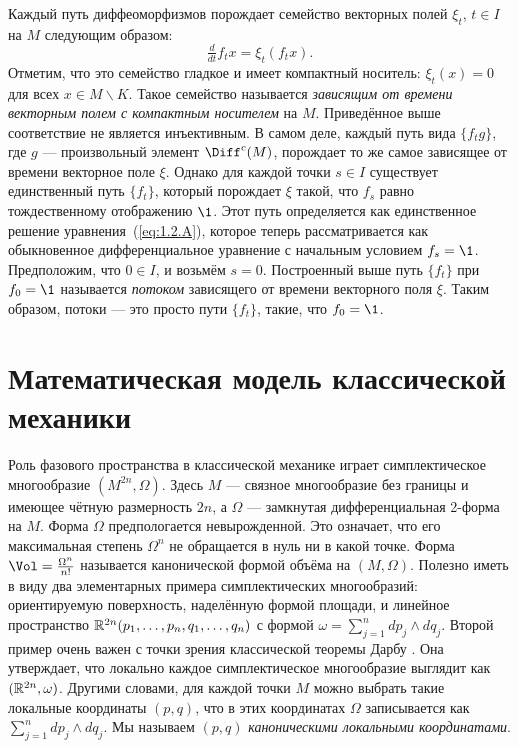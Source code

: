 Каждый путь диффеоморфизмов порождает семейство векторных полей $\xi_t$, $t \in I$ на $M$ следующим образом: 
\begin{equation}\tfrac{d}{dt} f_t x = \xi_t (f_t x).
\label{eq:1.2.A}
\end{equation}
Отметим, что это семейство гладкое и имеет компактный носитель: $\xi_t (x) = 0$ для всех $x \in M \backslash K$.
Такое семейство называется \emph{зависящим от времени векторным полем с компактным носителем} на $M$.
Приведённое выше соответствие не является инъективным.
В самом деле, каждый путь вида $\{f_t g\}$, где $g$ --- произвольный элемент $\Diff^c (M)$, порождает то же самое зависящее от времени векторное поле $\xi$.
Однако для каждой точки $s \in I$ существует единственный путь $\{f_t\}$, который 
порождает $\xi$ такой, что $f_s$ равно тождественному отображению $\1$.
Этот путь определяется как единственное решение уравнения~(\ref{eq:1.2.A}), которое теперь рассматривается как обыкновенное дифференциальное уравнение с начальным условием $f_s = \1$.
Предположим, что $0 \in I$, и возьмём $s = 0$.
Построенный выше путь $\{f_t\}$ при $f_0 = \1$ называется \emph{потоком} зависящего от времени векторного поля $\xi$.
Таким образом, потоки --- это просто пути $\{f_t\}$, такие, что $f_0 = \1$.

\section{Математическая модель классической механики}

Роль фазового пространства в классической механике играет симплектическое многообразие $(M^{2n},\Omega)$.
Здесь $M$ --- связное многообразие без границы и имеющее чётную размерность $2n$, а $\Omega$ --- замкнутая дифференциальная 2-форма на $M$.
Форма $\Omega$ предпологается невырожденной.
Это означает, что его максимальная степень $\Omega^n$ не обращается в нуль ни в какой точке.
Форма $\Vol =  \tfrac{\Omega^n}{n!}$ называется канонической формой объёма на $(M, \Omega)$.
Полезно иметь в виду два элементарных примера симплектических многообразий:
ориентируемую поверхность, наделённую формой площади, и линейное пространство $\mathbb{R}^{2n} (p_1,\dots, p_n, q_1,\dots, q_n)$ с формой $\omega = \sum^n_{j = 1} dp_j \wedge dq_j$.
Второй пример очень важен с точки зрения классической теоремы Дарбу \cite{MS}.
Она утверждает, что локально каждое симплектическое многообразие выглядит как $(\mathbb{R}^{2n}, \omega)$.
Другими словами, для каждой точки $M$ можно выбрать такие локальные координаты $(p, q)$, что в этих координатах $\Omega$ записывается как $\sum^n_{j = 1} dp_j \wedge dq_j$.
Мы называем $(p, q)$ \emph{каноническими локальными координатами}.

